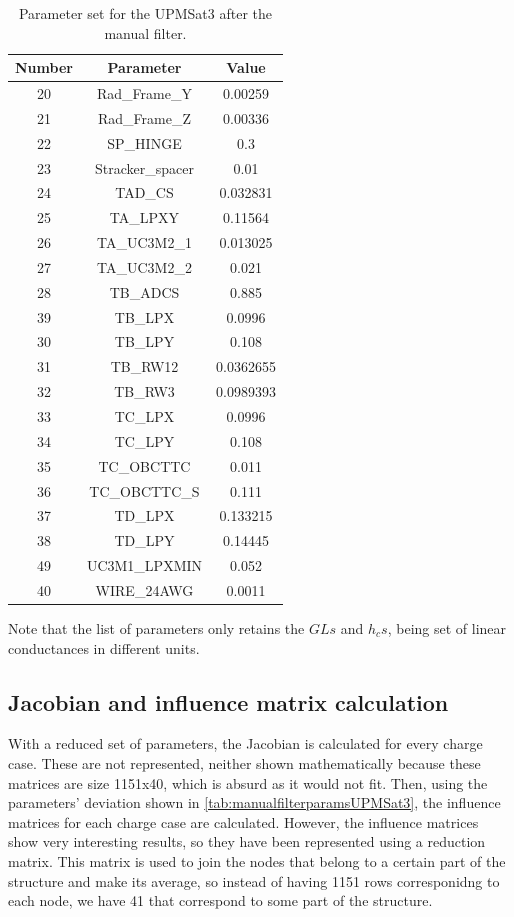     \begin{table}[H]
        \centering
        \caption{Parameter set for the UPMSat3 after the manual filter.}
        \label{tab:manualfilterparamsUPMSat3-2}
    \begin{tabular}{ccc}
        \hline
        Number & Parameter & Value \\
        \hline
    20 & Rad\_Frame\_Y & 0.00259 \\
    21 & Rad\_Frame\_Z & 0.00336 \\
    22 & SP\_HINGE & 0.3 \\
    23 & Stracker\_spacer & 0.01 \\
    24 & TAD\_CS & 0.032831 \\
    25 & TA\_LPXY & 0.11564 \\
    26 & TA\_UC3M2\_1 & 0.013025 \\
    27 & TA\_UC3M2\_2 & 0.021 \\
    28 & TB\_ADCS & 0.885 \\
    39 & TB\_LPX & 0.0996 \\
    30 & TB\_LPY & 0.108 \\
    31 & TB\_RW12 & 0.0362655 \\
    32 & TB\_RW3 & 0.0989393 \\
    33 & TC\_LPX & 0.0996 \\
    34 & TC\_LPY & 0.108 \\
    35 & TC\_OBCTTC & 0.011 \\
    36 & TC\_OBCTTC\_S & 0.111 \\
    37 & TD\_LPX & 0.133215 \\
    38 & TD\_LPY & 0.14445 \\
    49 & UC3M1\_LPXMIN & 0.052   \\
    40 & WIRE\_24AWG & 0.0011  \\

    \bottomrule
    \end{tabular}
\end{table}
Note that the list of parameters only retains the $GLs$ and $h_cs$, being set of linear conductances in different units.

\subsection{Jacobian and influence matrix calculation}
With a reduced set of parameters, the Jacobian is calculated for every charge case. These are not represented, neither shown mathematically because these matrices are size 1151x40, which is absurd as it would not fit. Then, using the parameters' deviation shown in \autoref{tab:manualfilterparamsUPMSat3}, the influence matrices for each charge case are calculated. However, the influence matrices show very interesting results, so they have been represented using a reduction matrix. This matrix is used to join the nodes that belong to a certain part of the structure and make its average, so instead of having 1151 rows corresponidng to each node, we have 41 that correspond to some part of the structure.

